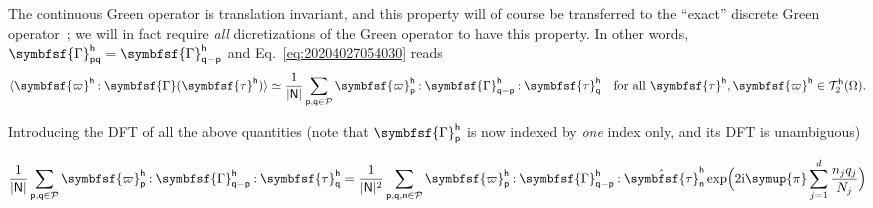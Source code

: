 \documentclass[draft, appendixprefix=true, chapterprefix=true, fontsize=12pt, numbers=noendperiod]{scrbook}
\newcommand{\cellindices}{\mathcal P}
\newcommand{\dbldot}{\mathbin{\mathord{:}}}
\newcommand{\I}{\mathrm{i}}
\newcommand{\tens}[1]{\symbfsf{#1}}
\newcommand{\PI}{\symup{\pi}}
\newcommand{\tensors}{\mathcal T}
\newcommand{\tuple}[1]{\mathsf{#1}}
\begin{document}
The continuous Green operator is translation invariant, and this property will
of course be transferred to the ``exact'' discrete Green operator~; we will in
fact require \emph{all} dicretizations of the Green operator to have this
property. In other words,
\(\tens\Gamma_{\tuple{p}\tuple{q}}^{\tuple{h}}=\tens\Gamma_{\tuple{q}-\tuple{p}}^{\tuple{h}}\)
and Eq.~\eqref{eq:20204027054030} reads
\begin{equation}
  \langle\tens\varpi^{\tuple{h}}\dbldot\tens\Gamma(\tens\tau^{\tuple{h}})\rangle
  \simeq\frac1{\lvert\tuple{N}\rvert}\sum_{\tuple{p}, \tuple{q}\in\cellindices}
  \tens\varpi_{\tuple{p}}^{\tuple{h}}\dbldot
  \tens\Gamma_{\tuple{q}-\tuple{p}}^{\tuple{h}}\dbldot\tens
  \tau_{\tuple{q}}^{\tuple{h}}\quad\text{for all }\tens\tau^{\tuple{h}},\tens
  \varpi^{\tuple{h}}\in\tensors_2^{\tuple{h}}(\Omega).
\end{equation}

Introducing the DFT of all the above quantities (note that
\(\tens\Gamma_{\tuple{p}}^{\tuple{h}}\) is now indexed by \emph{one} index
only, and its DFT is unambiguous)

\begin{equation}
  \begin{aligned}[b]
    \frac{1}{\lvert\tuple N\rvert}\sum_{\tuple{p}, \tuple{q}\in\cellindices}
    \tens\varpi_{\tuple{p}}^{\tuple{h}}\dbldot\tens\Gamma_{\tuple{q}-\tuple{p}}^{\tuple{h}}
    \dbldot\tens\tau_{\tuple{q}}^{\tuple{h}}=\frac{1}{\lvert\tuple N\rvert^2}
    \sum_{\tuple{p}, \tuple{q}, \tuple{n}\in\cellindices}
    \tens\varpi_{\tuple{p}}^{\tuple{h}}\dbldot\tens\Gamma_{\tuple{q}-\tuple{p}}^{\tuple{h}}
    \dbldot\hat{\tens\tau}_{\tuple{n}}^{\tuple{h}}\exp\Bigl(2\I\PI\sum_{j=1}^d
    \frac{n_jq_j}{N_j}\Bigr)
  \end{aligned}
\end{equation}
\end{document}
